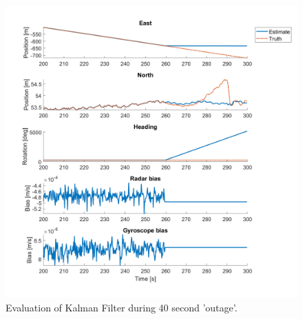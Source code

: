 \documentclass[12pt,letterpaper, onecolumn]{exam}
\begin{document}
\begin{questions}
\begin{parts}
{            \begin{figure}[!h]
                \centering
                \includegraphics[width=.75\linewidth]{Q3filter_c.png}
                \caption{Evaluation of Kalman Filter during 40 second 'outage'.}
                \label{}
            \end{figure}
        }


\end{parts}
\end{questions}
\end{document}
